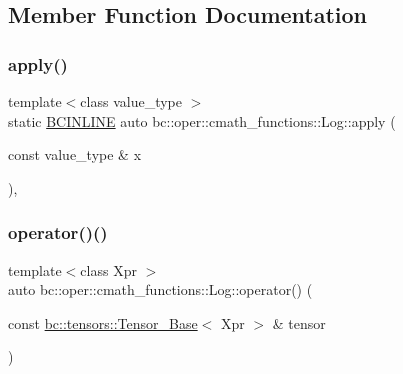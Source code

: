 \subsection{Member Function Documentation}
\mbox{\label{structbc_1_1oper_1_1cmath__functions_1_1Log_a46e99b2cd4130fad15fe14c5e974f94d}} 
\subsubsection{\texorpdfstring{apply()}{apply()}}
{\footnotesize\ttfamily template$<$class value\+\_\+type $>$ \\
static \hyperlink{common_8h_a6699e8b0449da5c0fafb878e59c1d4b1}{B\+C\+I\+N\+L\+I\+NE} auto bc\+::oper\+::cmath\+\_\+functions\+::\+Log\+::apply (\begin{DoxyParamCaption}\item[{const value\+\_\+type \&}]{x }\end{DoxyParamCaption})\hspace{0.3cm}{\ttfamily [inline]}, {\ttfamily [static]}}

\mbox{\label{structbc_1_1oper_1_1cmath__functions_1_1Log_a19ab7083250b6f333610756453b81005}} 
\subsubsection{\texorpdfstring{operator()()}{operator()()}\hspace{0.1cm}{\footnotesize\ttfamily [1/3]}}
{\footnotesize\ttfamily template$<$class Xpr $>$ \\
auto bc\+::oper\+::cmath\+\_\+functions\+::\+Log\+::operator() (\begin{DoxyParamCaption}\item[{const \hyperlink{classbc_1_1tensors_1_1Tensor__Base}{bc\+::tensors\+::\+Tensor\+\_\+\+Base}$<$ Xpr $>$ \&}]{tensor }\end{DoxyParamCaption})\hspace{0.3cm}{\ttfamily [inline]}}

